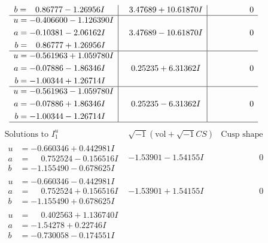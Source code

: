 \documentclass[1p]{elsarticle_modified}
\theoremstyle{definition}
\newcommand{\I}{\sqrt{-1}}
\begin{document}
$$\begin{array}{c|c|c}
\begin{aligned}
b &= \phantom{-}0.86777 - 1.26956 I\end{aligned}
 & \phantom{-}3.47689 + 10.61870 I & \phantom{-0.000000 } 0 \\ \hline\begin{aligned}
u &= -0.406600 - 1.126390 I \\
a &= -0.10381 - 2.06162 I \\
b &= \phantom{-}0.86777 + 1.26956 I\end{aligned}
 & \phantom{-}3.47689 - 10.61870 I & \phantom{-0.000000 } 0 \\ \hline\begin{aligned}
u &= -0.561963 + 1.059780 I \\
a &= -0.07886 - 1.86346 I \\
b &= -1.00344 + 1.26714 I\end{aligned}
 & \phantom{-}0.25235 + 6.31362 I & \phantom{-0.000000 } 0 \\ \hline\begin{aligned}
u &= -0.561963 - 1.059780 I \\
a &= -0.07886 + 1.86346 I \\
b &= -1.00344 - 1.26714 I\end{aligned}
 & \phantom{-}0.25235 - 6.31362 I & \phantom{-0.000000 } 0\\
 \hline 
 \end{array}$$\newpage$$\begin{array}{c|c|c}  
\text{Solutions to }I^u_{1}& \I (\text{vol} + \sqrt{-1}CS) & \text{Cusp shape}\\
 \hline 
\begin{aligned}
u &= -0.660346 + 0.442981 I \\
a &= \phantom{-}0.752524 - 0.156516 I \\
b &= -1.155490 - 0.678625 I\end{aligned}
 & -1.53901 - 1.54155 I & \phantom{-0.000000 } 0 \\ \hline\begin{aligned}
u &= -0.660346 - 0.442981 I \\
a &= \phantom{-}0.752524 + 0.156516 I \\
b &= -1.155490 + 0.678625 I\end{aligned}
 & -1.53901 + 1.54155 I & \phantom{-0.000000 } 0 \\ \hline\begin{aligned}
u &= \phantom{-}0.402563 + 1.136740 I \\
a &= -1.54278 + 0.22746 I \\
b &= -0.730058 - 0.174551 I\end{aligned}

\end{array}$$
\end{document}
